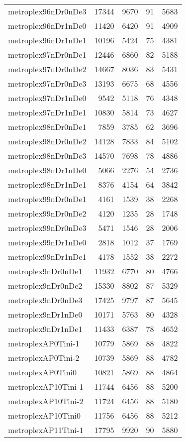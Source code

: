 \begin{longtable}{lrrrr}
metroplex96nDr0nDe3 & 17344 & 9670 & 91 & 5683 \\
metroplex96nDr1nDe0 & 11420 & 6420 & 91 & 4909 \\
metroplex96nDr1nDe1 & 10196 & 5424 & 75 & 4381 \\
metroplex97nDr0nDe1 & 12446 & 6860 & 82 & 5188 \\
metroplex97nDr0nDe2 & 14667 & 8036 & 83 & 5431 \\
metroplex97nDr0nDe3 & 13193 & 6675 & 68 & 4556 \\
metroplex97nDr1nDe0 & 9542 & 5118 & 76 & 4348 \\
metroplex97nDr1nDe1 & 10830 & 5814 & 73 & 4627 \\
metroplex98nDr0nDe1 & 7859 & 3785 & 62 & 3696 \\
metroplex98nDr0nDe2 & 14128 & 7833 & 84 & 5102 \\
metroplex98nDr0nDe3 & 14570 & 7698 & 78 & 4886 \\
metroplex98nDr1nDe0 & 5066 & 2276 & 54 & 2736 \\
metroplex98nDr1nDe1 & 8376 & 4154 & 64 & 3842 \\
metroplex99nDr0nDe1 & 4161 & 1539 & 38 & 2268 \\
metroplex99nDr0nDe2 & 4120 & 1235 & 28 & 1748 \\
metroplex99nDr0nDe3 & 5471 & 1546 & 28 & 2006 \\
metroplex99nDr1nDe0 & 2818 & 1012 & 37 & 1769 \\
metroplex99nDr1nDe1 & 4178 & 1552 & 38 & 2272 \\
metroplex9nDr0nDe1 & 11932 & 6770 & 80 & 4766 \\
metroplex9nDr0nDe2 & 15330 & 8802 & 87 & 5329 \\
metroplex9nDr0nDe3 & 17425 & 9797 & 87 & 5645 \\
metroplex9nDr1nDe0 & 10171 & 5763 & 80 & 4328 \\
metroplex9nDr1nDe1 & 11433 & 6387 & 78 & 4652 \\
metroplexAP0Tini-1 & 10779 & 5869 & 88 & 4822 \\
metroplexAP0Tini-2 & 10739 & 5869 & 88 & 4782 \\
metroplexAP0Tini0 & 10821 & 5869 & 88 & 4864 \\
metroplexAP10Tini-1 & 11744 & 6456 & 88 & 5200 \\
metroplexAP10Tini-2 & 11724 & 6456 & 88 & 5180 \\
metroplexAP10Tini0 & 11756 & 6456 & 88 & 5212 \\
metroplexAP11Tini-1 & 17795 & 9920 & 90 & 5880 \\

\end{longtable}
